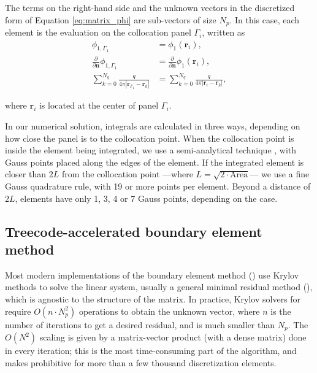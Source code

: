 The terms on the right-hand side and the unknown vectors in the discretized form of Equation \eqref{eq:matrix_phi} are sub-vectors of size $N_p$. In this case, each element is the evaluation on the collocation panel $\Gamma_i$, written as
%
\begin{align} \label{eq:vector_disc}
\phi_{1,\Gamma_1} &= \phi_1(\mathbf{r}_i), \nonumber \\
\frac{\partial}{\partial \mathbf{n}}\phi_{1,\Gamma_1} &= \frac{\partial}{\partial \mathbf{n}}\phi_1(\mathbf{r}_i), \nonumber \\
\sum_{k=0}^{N_q} \frac{q}{4\pi|\mathbf{r}_{\Gamma_1} - \mathbf{r}_k|} &= \sum_{k=0}^{N_q} \frac{q}{4\pi|\mathbf{r}_i - \mathbf{r}_k|},
\end{align}

\noindent where $\mathbf{r}_i$ is located at the center of panel $\Gamma_i$.

In our numerical solution, integrals are calculated in three ways, depending on how close the panel is to the collocation point. When the collocation point is inside the element being integrated, we use a semi-analytical technique \cite{ZhuHuangSongWhite2001}, with Gauss points placed along the edges of the element. If the integrated element is closer than $2L$ from the collocation point ---where $L = \sqrt{2\cdot \text{Area}}$--- we use a fine Gauss quadrature rule, with 19 or more points per element. Beyond a distance of $2L$, elements have only 1, 3, 4 or 7 Gauss points, depending on the case.

\subsection{Treecode-accelerated boundary element method}

Most modern implementations of the boundary element method (\bem) use Krylov methods to solve the linear system, usually a general minimal residual method (\gmres), which is agnostic to the structure of the matrix. In practice, Krylov solvers for \bem require $O(n \cdot N_p^2)$ operations to obtain the unknown vector, where $n$ is the number of iterations to get a desired residual, and is much smaller than $N_p$. The $O(N^2)$ scaling is given by a matrix-vector product (with a dense matrix) done in every iteration; this is the most time-consuming part of the algorithm, and makes \bem prohibitive for more than a few thousand discretization elements. 

